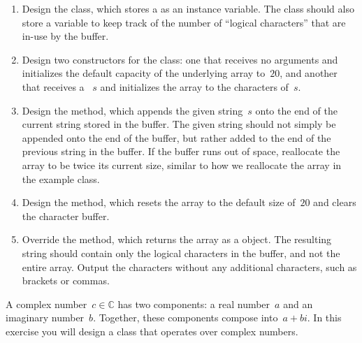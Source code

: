 \begin{enumerate}[label=(\alph*)]
    \item Design the  class, which stores a  as an instance variable. The class should also store a variable to keep track of the number of ``logical characters'' that are in-use by the buffer.
    \item Design two constructors for the  class: one that receives no arguments and initializes the default capacity of the underlying  array to~$20$, and another that receives a ~$s$ and initializes the  array to the characters of~$s$. 
    \item Design the  method, which appends the given string~$s$ onto the end of the current string stored in the buffer. The given string should not simply be appended onto the end of the buffer, but rather added to the end of the previous string in the buffer. If the buffer runs out of space, reallocate the array to be twice its current size, similar to how we reallocate the array in the  example class.
    \item Design the  method, which resets the  array to the default size of~$20$ and clears the character buffer.
    \item Override the  method, which returns the  array as a  object. The resulting string should contain only the logical characters in the buffer, and not the entire array. Output the characters without any additional characters, such as brackets or commas.
\end{enumerate}

A complex number~$c \in \mathbb{C}$ has two components: a real number~$a$ and an imaginary number~$b$. 
Together, these components compose into~$a + bi$. 
In this exercise you will design a class that operates over complex numbers.

